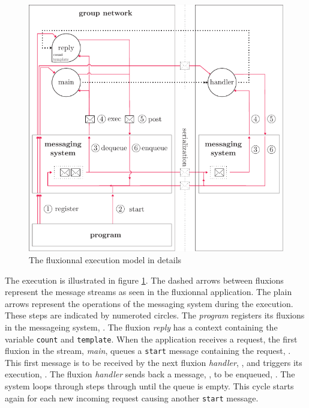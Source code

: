 \begin{figure}[h!]
  \includegraphics[width=\linewidth]{../resources/schema-message.pdf}
  \caption{The fluxionnal execution model in details}
  \label{fig:MesSys}
\end{figure}

The execution is illustrated in figure \ref{fig:MesSys}.
The dashed arrows between fluxions represent the message streams as seen in the fluxionnal application.
The plain arrows represent the operations of the messaging system during the execution.
These steps are indicated by numeroted circles.
The \textit{program} registers its fluxions in the messageing system, .
The fluxion \textit{reply} has a context containing the variable \texttt{count} and \texttt{tem\-plate}.
When the application receives a request, the first fluxion in the stream, \textit{main}, queues a \texttt{start} message containing the request, .
This first message is to be received by the next fluxion \textit{handler}, , and triggers its execution, .
The fluxion \textit{handler} sends back a message, , to be enqueued, .
The system loops through steps  through  until the queue is empty.
This cycle starts again for each new incoming request causing another \texttt{start} message.


